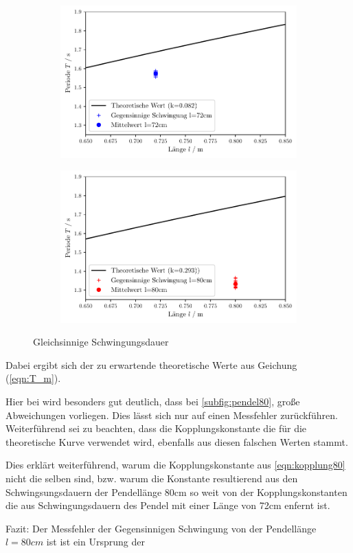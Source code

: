 \begin{figure}
    \begin{subfigure}[c]{0.5\textwidth}
        \includegraphics[width=\textwidth]{plots/plot2.pdf}
    \end{subfigure}
    \begin{subfigure}[c]{0.5\textwidth}
        \includegraphics[width=\textwidth]{plots/plot3.pdf}
        \label{subfig:pedel80}
    \end{subfigure}
    \caption{Gleichsinnige Schwingungsdauer}
\end{figure}

Dabei ergibt sich der zu erwartende theoretische Werte aus Geichung (\ref{eqn:T_m}).

Hier bei wird besonders gut deutlich, dass bei \ref{subfig:pendel80}, große Abweichungen
vorliegen. Dies lässt sich nur auf einen Messfehler zurückführen.
Weiterführend sei zu beachten, dass die Kopplungskonstante die für die theoretische Kurve
verwendet wird, ebenfalls aus diesen falschen Werten stammt.

Dies erklärt weiterführend, warum die Kopplungskonstante aus \ref{eqn:kopplung80} nicht die selben
sind, bzw. warum die Konstante resultierend aus den Schwingsungsdauern der Pendellänge 80cm so weit von der
Kopplungskonstanten die aus Schwingungsdauern des Pendel mit einer Länge von 72cm enfernt ist.

Fazit: Der Messfehler der Gegensinnigen Schwingung von der Pendellänge $l=80cm$ ist 
ist ein Ursprung der 